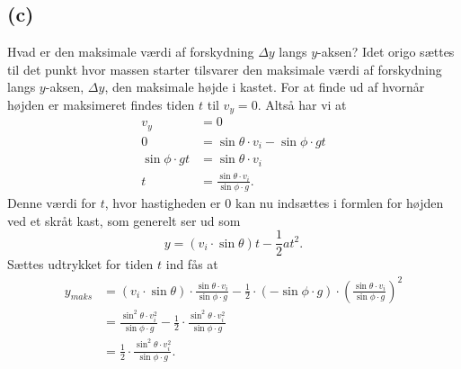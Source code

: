 \documentclass[12pt]{article}
\theoremstyle{definition}
\begin{document}
\subsection*{(c)}
Hvad er den maksimale værdi af forskydning $\Delta y$ langs $y$-aksen?
\bigbreak
Idet origo sættes til det punkt hvor massen starter tilsvarer den maksimale værdi af forskydning langs $y$-aksen, $\Delta y$, den maksimale højde i kastet. For at finde ud af hvornår højden er maksimeret findes tiden $t$ til $v_y = 0$. Altså har vi at
\begin{align*}
  v_y &= 0 \\
  0 &= \sin \theta \cdot v_i - \sin \phi \cdot gt \\
  \sin \phi \cdot gt &= \sin\theta \cdot v_i\\
  t &= \frac{\sin \theta \cdot v_i}{\sin \phi \cdot g}
.\end{align*}
Denne værdi for $t$, hvor hastigheden er $0$ kan nu indsættes i formlen for højden ved et skråt kast, som generelt ser ud som
\[ 
y = (v_i \cdot \sin \theta)t - \frac{1}{2}at^2
.\]
Sættes udtrykket for tiden $t$ ind fås at
\begin{align*}
  y_{maks} &= \left( v_i \cdot \sin\theta \right) \cdot \frac{\sin\theta \cdot v_i}{\sin \phi \cdot g} - \frac{1}{2} \cdot \left( -\sin\phi \cdot g \right) \cdot \left( \frac{\sin \theta \cdot v_i}{\sin \phi \cdot g} \right)^2\\
  &= \frac{\sin^2 \theta \cdot v_i^2}{\sin \phi \cdot g} - \frac{1}{2} \cdot \frac{\sin^2 \theta \cdot v_i^2}{\sin \phi \cdot g} \\
  &= \frac{1}{2} \cdot \frac{\sin^2 \theta \cdot v_i^2}{\sin\phi \cdot g}
.\end{align*}
\end{document}
